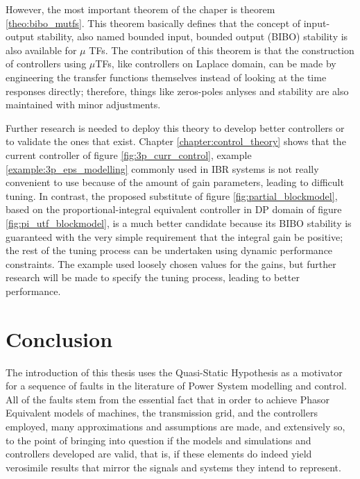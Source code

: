 	However, the most important theorem of the chaper is theorem \ref{theo:bibo_mutfs}. This theorem basically defines that the concept of input-output stability, also named bounded input, bounded output (BIBO) stability is also available for $\mu$ TFs. The contribution of this theorem is that the construction of controllers using $\mu$TFs, like controllers on Laplace domain, can be made by engineering the transfer functions themselves instead of looking at the time responses directly; therefore, things like zeros-poles anlyses and stability are also maintained with minor adjustments.

	Further research is needed to deploy this theory to develop better controllers or to validate the ones that exist. Chapter  \ref{chapter:control_theory} shows that the current controller of figure \ref{fig:3p_curr_control}, example \ref{example:3p_eps_modelling} commonly used in IBR systems is not really convenient to use because of the amount of gain parameters, leading to difficult tuning. In contrast, the proposed substitute of figure \ref{fig:partial_blockmodel}, based on the proportional-integral equivalent controller in DP domain of figure \ref{fig:pi_utf_blockmodel}, is a much better candidate because its BIBO stability is guaranteed with the very simple requirement that the integral gain be positive; the rest of the tuning process can be undertaken using dynamic performance constraints. The example used loosely chosen values for the gains, but further research will be made to specify the tuning process, leading to better performance.

\section{Conclusion} %

	The introduction of this thesis uses the Quasi-Static Hypothesis as a motivator for a sequence of faults in the literature of Power System modelling and control. All of the faults stem from the essential fact that in order to achieve Phasor Equivalent models of machines, the transmission grid, and the controllers employed, many approximations and assumptions are made, and extensively so, to the point of bringing into question if the models and simulations and controllers developed are valid, that is, if these elements do indeed yield verosimile results that mirror the signals and systems they intend to represent.

